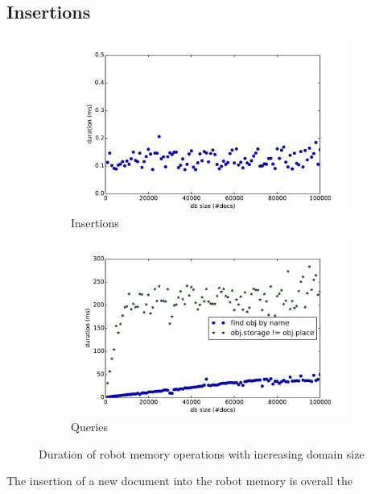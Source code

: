 \subsection{Insertions}
\label{sec:insertions}
\begin{figure}
  \centering
  \begin{subfigure}[b]{0.5\textwidth}
    \includegraphics[width=\textwidth]{plots/insert-durations}
    \caption{Insertions}
    \label{fig:insert-durations}
  \end{subfigure}
  \begin{subfigure}[b]{0.5\textwidth}
    \includegraphics[width=\textwidth]{plots/query-durations}
    \caption{Queries}
    \label{fig:query-durations}
  \end{subfigure}
  \caption[Duration of insert operations with increasing domain size]{Duration of robot memory operations with increasing domain size}
  \label{fig:eval-durations-1}
\end{figure}
The insertion of a new document into the robot memory is overall the
